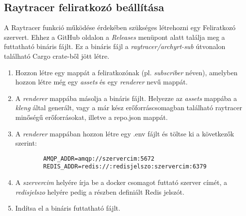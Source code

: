 \subsection{Raytracer feliratkozó beállítása}\label{subscriber}


A Raytracer funkció működése érdekében szükséges létrehozni egy Feliratkozó szervert.
Ehhez a GitHub oldalon a \emph{Releases} menüpont alatt találja meg a futtatható bináris fájlt.
Ez a bináris fájl a \emph{raytracer/archyrt-sub} útvonalon található Cargo crate-ből jött létre.


\begin{enumerate}
    \item Hozzon létre egy mappát a feliratkozónak (pl. \emph{subscriber} néven), amelyben hozzon létre még egy \emph{assets} és egy \emph{renderer} nevű mappát.

    \item A \emph{renderer} mappába másolja a bináris fájlt. Helyezze az \emph{assets} mappába a \emph{kleng} által generált, vagy a már kész erőforráscsomagban található raytracer minőségű erőforrásokat, illetve a repo.json mappát.

    \item A \emph{renderer} mappában hozzon létre egy .env fájlt és töltse ki a következők szerint:
          \begin{lstlisting}
        AMQP_ADDR=amqp://szervercim:5672
        REDIS_ADDR=redis://:redisjelszo:szervercim:6379\end{lstlisting}

    \item A \emph{szervercim} helyére írja be a docker csomagot futtató szerver címét, a \emph{redisjelszo} helyére pedig a \textbf{} részben definiált Redis jelszót.

    \item Indítsa el a bináris futtatható fájlt.
\end{enumerate}